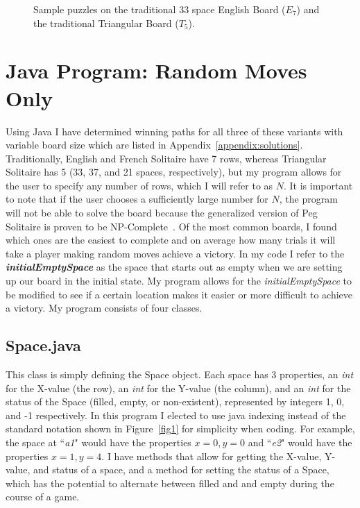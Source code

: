 \documentclass{article}
\begin{document}
\begin{figure}[htb]
\centering
{}
\caption{Sample puzzles on the traditional 33 space English Board ($E_7$) and the traditional Triangular Board ($T_5$).}
\label{fig2}
\end{figure}

\section{Java Program: Random Moves Only}
Using Java I have determined winning paths for all three of these variants with variable board size which are listed in Appendix~\ref{appendix:solutions}. Traditionally, English and French Solitaire have 7 rows, whereas Triangular Solitaire has 5 (33, 37, and 21 spaces, respectively), but my program allows for the user to specify any number of rows, which I will refer to as \textbf{$N$}. It is important to note that if the user chooses a sufficiently large number for $N$, the program will not be able to solve the board because the generalized version of Peg Solitaire is proven to be NP-Complete~\cite{Uehara}. Of the most common boards, I found which ones are the easiest to complete and on average how many trials it will take a player making random moves achieve a victory. In my code I refer to the \textbf{\textit{initialEmptySpace}} as the space that starts out as empty when we are setting up our board in the initial state. My program allows for the \textit{initialEmptySpace} to be modified to see if a certain location makes it easier or more difficult to achieve a victory. My program consists of four classes.

\subsection{Space.java}
This class is simply defining the Space object. Each space has 3 properties, an \textit{int} for the X-value (the row), an \textit{int} for the Y-value (the column), and an \textit{int} for the status of the Space (filled, empty, or non-existent), represented by integers 1, 0, and -1 respectively. In this program I elected to use java indexing instead of the standard notation shown in  Figure~\ref{fig1} for simplicity when coding. For example, the space at ``\textit{a1}" would have the properties $x=0, y=0$ and ``\textit{e2}" would have the properties $x=1,y=4$. I have methods that allow for getting the X-value, Y-value, and status of a space, and a method for setting the status of a Space, which has the potential to alternate between filled and and empty during the course of a game.
\end{document}
